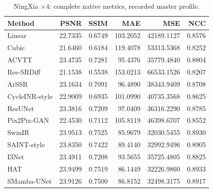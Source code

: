 \begin{table}[t]\centering\small
\caption{NingXia $\times4$: complete native metrics, recorded master profile.}
\begin{tabular}{lrrrrr}\toprule Method&PSNR&SSIM&MAE&MSE&NCC\\\midrule
Linear & 22.7335 & 0.6749 & 103.2052 & 42189.1127 & 0.8576\\
Cubic & 21.6460 & 0.6184 & 119.4078 & 53313.5368 & 0.8252\\
ACVTT & 23.4735 & 0.7281 & 95.4376 & 35779.4840 & 0.8804\\
Res-SRDiff & 21.1538 & 0.5538 & 153.0213 & 66533.1526 & 0.8207\\
ArSSR & 23.1634 & 0.7091 & 96.4890 & 38343.9409 & 0.8708\\
CycleINR-style & 22.9009 & 0.6935 & 101.0990 & 40735.3568 & 0.8625\\
ResUNet & 23.3816 & 0.7209 & 97.0409 & 36316.2290 & 0.8785\\
Pix2Pix-GAN & 22.4530 & 0.7112 & 105.8119 & 46398.6707 & 0.8552\\
SwinIR & 23.9513 & 0.7525 & 85.9679 & 32030.5455 & 0.8930\\
SAINT-style & 23.8350 & 0.7422 & 89.4140 & 32992.9496 & 0.8905\\
I3Net & 23.4911 & 0.7208 & 93.5655 & 35725.4805 & 0.8825\\
HAT & 23.9499 & 0.7519 & 86.1449 & 32226.9860 & 0.8933\\
SMamba-UNet & 23.9126 & 0.7500 & 86.8152 & 32498.3175 & 0.8917\\
\bottomrule\end{tabular}\end{table}
